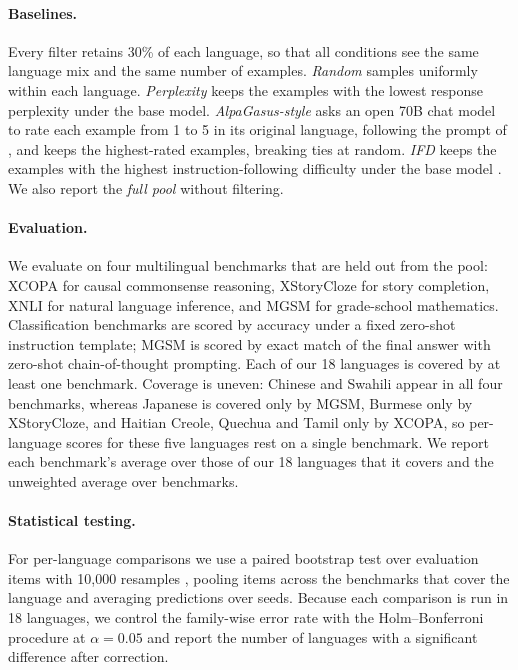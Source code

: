 \documentclass{article}
\begin{document}
\paragraph{Baselines.}
Every filter retains 30\% of each language, so that all conditions see the same language mix and the same number of examples. \emph{Random} samples uniformly within each language. \emph{Perplexity} keeps the examples with the lowest response perplexity under the base model. \emph{AlpaGasus-style} asks an open 70B chat model to rate each example from 1 to 5 in its original language, following the prompt of \citet{chen2024alpagasus}, and keeps the highest-rated examples, breaking ties at random. \emph{IFD} keeps the examples with the highest instruction-following difficulty under the base model \citep{li2024ifd}. We also report the \emph{full pool} without filtering.

\paragraph{Evaluation.}
We evaluate on four multilingual benchmarks that are held out from the pool: XCOPA \citep{ponti2020xcopa} for causal commonsense reasoning, XStoryCloze \citep{lin2022xglm} for story completion, XNLI \citep{conneau2018xnli} for natural language inference, and MGSM \citep{shi2023mgsm} for grade-school mathematics. Classification benchmarks are scored by accuracy under a fixed zero-shot instruction template; MGSM is scored by exact match of the final answer with zero-shot chain-of-thought prompting. Each of our 18 languages is covered by at least one benchmark. Coverage is uneven: Chinese and Swahili appear in all four benchmarks, whereas Japanese is covered only by MGSM, Burmese only by XStoryCloze, and Haitian Creole, Quechua and Tamil only by XCOPA, so per-language scores for these five languages rest on a single benchmark. We report each benchmark's average over those of our 18 languages that it covers and the unweighted average over benchmarks.

\paragraph{Statistical testing.}
For per-language comparisons we use a paired bootstrap test over evaluation items with 10,000 resamples \citep{koehn2004significance,dror2018hitchhiker}, pooling items across the benchmarks that cover the language and averaging predictions over seeds. Because each comparison is run in 18 languages, we control the family-wise error rate with the Holm--Bonferroni procedure \citep{holm1979simple} at $\alpha = 0.05$ and report the number of languages with a significant difference after correction.
\end{document}
